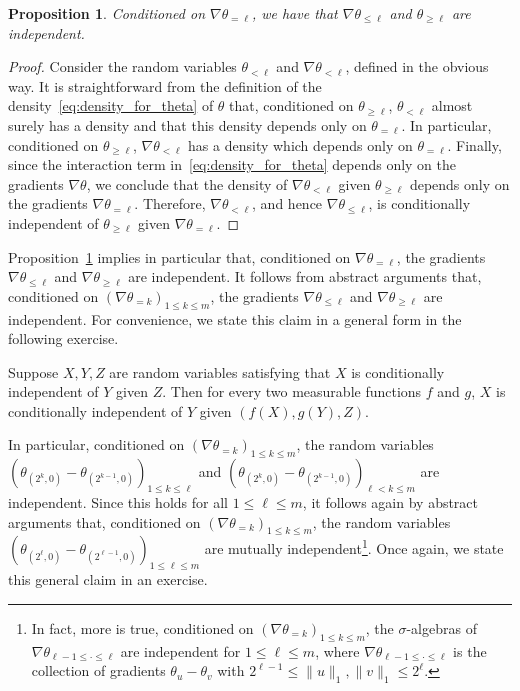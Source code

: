 \documentclass[12pt,reqno]{article}
\newtheorem{proposition}[theorem]{Proposition}
\begin{document}
\begin{proposition}\label{prop:independence_given_gradients}
	Conditioned on $\nabla\theta_{=\ell}$, we have that $\nabla\theta_{\le \ell}$ and $\theta_{\ge \ell}$ are independent.
\end{proposition}
\begin{proof}
	Consider the random variables $\theta_{<\ell}$ and $\nabla\theta_{<\ell}$, defined in the obvious way. It is straightforward from the definition of the density~\eqref{eq:density_for_theta} of $\theta$ that, conditioned on $\theta_{\ge \ell}$, $\theta_{<\ell}$ almost surely has a density and that this density depends only on $\theta_{=\ell}$. In particular, conditioned on $\theta_{\ge \ell}$, $\nabla\theta_{<\ell}$ has a density which depends only on $\theta_{=\ell}$. Finally, since the interaction term in~\eqref{eq:density_for_theta} depends only on the gradients $\nabla\theta$, we conclude that the density of $\nabla\theta_{<\ell}$ given $\theta_{\ge \ell}$ depends only on the gradients $\nabla\theta_{=\ell}$. Therefore, $\nabla\theta_{<\ell}$, and hence $\nabla\theta_{\le\ell}$, is conditionally independent of $\theta_{\ge \ell}$ given $\nabla\theta_{=\ell}$.
\end{proof}

Proposition~\ref{prop:independence_given_gradients} implies in particular that, conditioned on $\nabla\theta_{=\ell}$, the gradients $\nabla\theta_{\le \ell}$ and $\nabla\theta_{\ge \ell}$ are independent. It follows from abstract arguments that, conditioned on $(\nabla\theta_{=k})_{1 \le k \le m}$, the gradients $\nabla\theta_{\le \ell}$ and $\nabla\theta_{\ge \ell}$ are independent. For convenience, we state this claim in a general form in the following exercise.

\medbreak
{} Suppose $X,Y,Z$ are random variables
satisfying that $X$ is conditionally independent of $Y$ given $Z$.
Then for every two measurable functions $f$ and $g$, $X$ is conditionally
independent of $Y$ given $(f(X), g(Y), Z)$.
\medbreak

In particular, conditioned on $(\nabla\theta_{=k})_{1 \le k \le m}$, the random variables $( \theta_{(2^k,0)}-\theta_{(2^{k-1},0)} )_{1 \le k \le \ell}$ and $( \theta_{(2^k,0)}-\theta_{(2^{k-1},0)} )_{\ell < k \le m}$ are independent. Since this holds for all $1 \le \ell \le m$, it follows again by abstract arguments that, conditioned on $(\nabla\theta_{=k})_{1 \le k \le m}$, the random variables $(\theta_{(2^\ell,0)}-\theta_{(2^{\ell-1},0)})_{1 \le \ell \le m}$ are mutually independent\footnote{In fact, more is true, conditioned on $(\nabla\theta_{=k})_{1 \le k \le m}$, the $\sigma$-algebras of $\nabla\theta_{\ell-1 \le \cdot \le \ell}$ are independent for $1 \le \ell \le m$, where $\nabla\theta_{\ell-1 \le \cdot \le \ell}$ is the collection of gradients $\theta_u - \theta_v$ with $2^{\ell-1} \le \|u\|_1,\|v\|_1 \le 2^\ell$.}. Once again, we state this general claim in an exercise.
\end{document}

